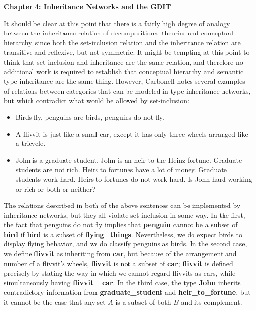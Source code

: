 \begin{center}
\Large \textbf{Chapter 4: Inheritance Networks and the GDIT} \\[1ex]
\end{center} 
\setcounter{section}{0}
It should be clear at this point that there is a fairly high degree of analogy between the inheritance relation of decompositional theories and conceptual hierarchy, since both the set-inclusion relation and the inheritance relation are transitive and reflexive, but not symmetric. It might be tempting at this point to think that set-inclusion and inheritance are the same relation, and therefore no additional work is required to establish that conceptual hierarchy and semantic type inheritance are the same thing. However, Carbonell \cite{carbonell_default_1980} notes several examples of relations between categories that can be modeled in type inheritance networks, but which contradict what would be allowed by set-inclusion:
\begin{itemize}
\item Birds fly, penguins are birds, penguins do not fly.
\item A flivvit is just like a small car, except it has only three wheels arranged like a tricycle.
\item John is a graduate student. John is an heir to the Heinz fortune. Graduate students are not rich. Heirs to fortunes have a lot of money. Graduate students work hard. Heirs to fortunes do not work hard. Is John hard-working or rich or both or neither?
\end{itemize}
The relations described in both of the above sentences can be implemented by inheritance networks, but they all violate set-inclusion in some way. In the first, the fact that penguins do not fly implies that {\bf penguin} cannot be a subset of {\bf bird} if {\bf bird} is a subset of {\bf flying\_things}. Nevertheless, we do expect birds to display flying behavior, and we do classify penguins as birds. In the second case, we define {\bf flivvit} as inheriting from {\bf car}, but because of the arrangement and number of a flivvit's wheels, {\bf flivvit} is not a subset of {\bf car}; {\bf flivvit} is defined precisely by stating the way in which we cannot regard flivvits as cars, while simultaneously having {\bf flivvit}$\sqsubseteq${\bf car}. In the third case, the type {\bf John} inherits contradictory information from {\bf graduate\_student} and {\bf heir\_to\_fortune}, but it cannot be the case that any set $A$ is a subset of both $B$ and its complement.

